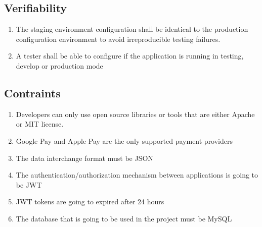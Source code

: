 \subsection{Verifiability}
\begin{enumerate}[label=SEC-\arabic*]
    \item The staging environment configuration shall be identical to the 
    production configuration environment to avoid irreproducible 
    testing failures.
    \item A tester shall be able to configure if the application is 
    running in testing, develop or production mode
\end{enumerate}

\subsection{Contraints}
\begin{enumerate}[label=SEC-\arabic*]
    \item Developers can only use open source libraries or tools that are 
    either Apache or MIT license.
    \item Google Pay and Apple Pay are the only supported payment providers
    \item The data interchange format must be JSON
    \item The authentication/authorization mechanism between applications 
    is going to be JWT
    \item JWT tokens are going to expired after 24 hours
    \item The database that is going to be used in the project must be MySQL
\end{enumerate}
\pagebreak